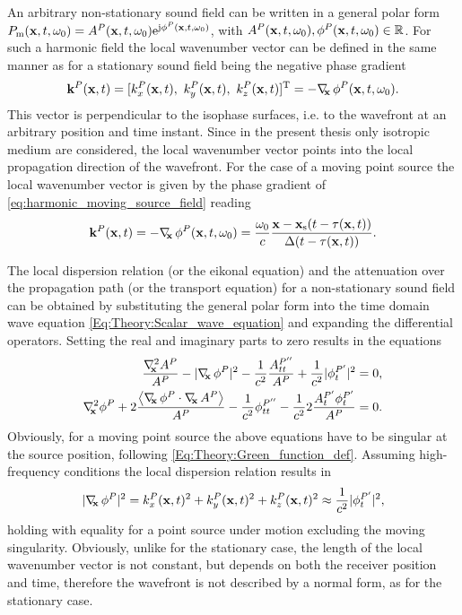 An arbitrary non-stationary sound field can be written in a general polar form $P_{\mathrm{m}}(\mathbf{x},t,\omega_0) = A^P(\mathbf{x},t,\omega_0) \mathrm{e}^{\mathrm{j} \phi^P(\mathbf{x},t,\omega_0)}$, with $A^P(\mathbf{x},t,\omega_0),\phi^P(\mathbf{x},t,\omega_0) \in \mathbb{R}$.
For such a harmonic field the local wavenumber vector can be defined in the same manner as for a stationary sound field being the negative phase gradient
\begin{equation}
\label{eq:HF_appr:general_loc_wn}
\mathbf{k}^P(\mathbf{x},t) = [k_x^P(\mathbf{x},t),\ k_y^P(\mathbf{x},t),\ k_z^P(\mathbf{x},t)]^{\mathrm{T}} = -\nabla_{\!\!\mathbf{x}}\, \phi^P(\mathbf{x},t,\omega_0).
\end{equation}
This vector is perpendicular to the isophase surfaces, i.e. to the wavefront at an arbitrary position and time instant.
Since in the present thesis only isotropic medium are considered, the local wavenumber vector points into the local propagation direction of the wavefront.
For the case of a moving point source the local wavenumber vector is given by the phase gradient of \eqref{eq:harmonic_moving_source_field} reading
\begin{equation}
\label{eq:HF_appr:moving_s_loc_wn}
\mathbf{k}^P(\mathbf{x},t) = -\nabla_{\!\!\mathbf{x}}\, \phi^P(\mathbf{x},t,\omega_0) = \frac{\omega_0}{c} \frac{\mathbf{x} -\mathbf{x}_{\mathrm{s}}(t-\tau(\mathbf{x},t))}{\Delta(t-\tau(\mathbf{x},t))}.
\end{equation}

The local dispersion relation (or the eikonal equation) and the attenuation over the propagation path (or the transport equation) for a non-stationary sound field can be obtained by substituting the general polar form into the time domain wave equation \eqref{Eq:Theory:Scalar_wave_equation} and expanding the differential operators.
Setting the real and imaginary parts to zero results in the equations
\begin{eqnarray}
\frac{\Lx A^P}{A^P}  - | \Dx \phi^P |^2 -\frac{1}{c^2} \frac{A^{P''}_{tt}}{A^P} +\frac{1}{c^2}|\phi^{P'}_{t}|^2 = 0, \\ 
\label{eq:HF_appr:transport_eq_non_stat}
\Lx \phi^P + 2\frac{ \left< \Dx \phi^P \cdot \Dx A^P \right> }{A^P} - \frac{1}{c^2} \phi^{P''}_{tt} - \frac{1}{c^2} 2\frac{A^{P'}_t \phi^{P'}_t }{A^P} = 0.
\end{eqnarray}
Obviously, for a moving point source the above equations have to be singular at the source position, following \eqref{Eq:Theory:Green_function_def}.
Assuming high-frequency conditions the local dispersion relation results in
\begin{equation} \label{eq:HF_appr:eikonal_eq_non_stat}
| \nabla_{\!\!\mathbf{x}}\, \phi^P |^2 = k_x^P(\mathbf{x},t)^2 + k_y^P(\mathbf{x},t)^2 + k_z^P(\mathbf{x},t)^2 \approx \frac{1}{c^2}|\phi^{P'}_{t}|^2,
\end{equation}
holding with equality for a point source under motion excluding the moving singularity.
Obviously, unlike for the stationary case, the length of the local wavenumber vector is not constant, but depends on both the receiver position and time, therefore the wavefront is not described by a normal form, as for the stationary case.

